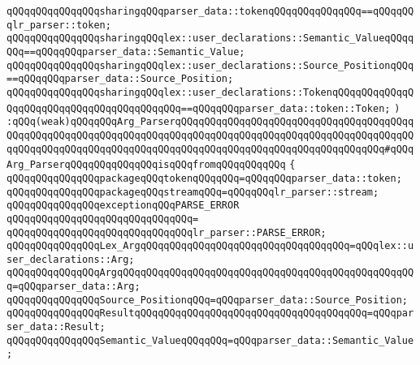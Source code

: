 \verb|qQQqqQQqqQQqqQQqsharingqQQqparser_data::tokenqQQqqQQqqQQqqQQq==qQQqqQQqlr_parser::token;|\newline
\newline
\verb|qQQqqQQqqQQqqQQqsharingqQQqlex::user_declarations::Semantic_ValueqQQqqQQq==qQQqqQQqparser_data::Semantic_Value;|\newline
\verb|qQQqqQQqqQQqqQQqsharingqQQqlex::user_declarations::Source_PositionqQQq==qQQqqQQqparser_data::Source_Position;|\newline
\verb|qQQqqQQqqQQqqQQqsharingqQQqlex::user_declarations::TokenqQQqqQQqqQQqqQQqqQQqqQQqqQQqqQQqqQQqqQQqqQQq==qQQqqQQqparser_data::token::Token;|\newline
\verb|)|\newline
\newline
\verb|:qQQq(weak)qQQqqQQqArg_ParserqQQqqQQqqQQqqQQqqQQqqQQqqQQqqQQqqQQqqQQqqQQqqQQqqQQqqQQqqQQqqQQqqQQqqQQqqQQqqQQqqQQqqQQqqQQqqQQqqQQqqQQqqQQqqQQqqQQqqQQqqQQqqQQqqQQqqQQqqQQqqQQqqQQqqQQqqQQqqQQqqQQqqQQqqQQqqQQq#qQQqArg_ParserqQQqqQQqqQQqqQQqisqQQqfromqQQqqQQqqQQq|\newline
\newline
\verb|{|\newline
\verb|qQQqqQQqqQQqqQQqpackageqQQqtokenqQQqqQQq=qQQqqQQqparser_data::token;|\newline
\verb|qQQqqQQqqQQqqQQqpackageqQQqstreamqQQq=qQQqqQQqlr_parser::stream;|\newline
\newline
\verb|qQQqqQQqqQQqqQQqexceptionqQQqPARSE_ERROR|\newline
\verb|qQQqqQQqqQQqqQQqqQQqqQQqqQQqqQQq=|\newline
\verb|qQQqqQQqqQQqqQQqqQQqqQQqqQQqqQQqlr_parser::PARSE_ERROR;|\newline
\newline
\verb|qQQqqQQqqQQqqQQqLex_ArgqQQqqQQqqQQqqQQqqQQqqQQqqQQqqQQqqQQq=qQQqlex::user_declarations::Arg;|\newline
\newline
\verb|qQQqqQQqqQQqqQQqArgqQQqqQQqqQQqqQQqqQQqqQQqqQQqqQQqqQQqqQQqqQQqqQQqqQQq=qQQqparser_data::Arg;|\newline
\verb|qQQqqQQqqQQqqQQqSource_PositionqQQq=qQQqparser_data::Source_Position;|\newline
\verb|qQQqqQQqqQQqqQQqResultqQQqqQQqqQQqqQQqqQQqqQQqqQQqqQQqqQQqqQQq=qQQqparser_data::Result;|\newline
\verb|qQQqqQQqqQQqqQQqSemantic_ValueqQQqqQQq=qQQqparser_data::Semantic_Value;|\newline
